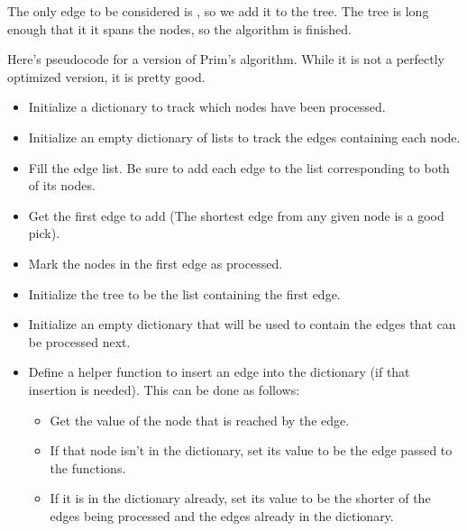 The only edge to be considered is , so we add it to the tree.
The tree is long enough that it it spans the nodes, so the algorithm is finished.

Here's pseudocode for a version of Prim's algorithm.
While it is not a perfectly optimized version, it is pretty good.

\begin{itemize}


\item Initialize a dictionary to track which nodes have been processed.

\item Initialize an empty dictionary of lists to track the edges containing each node.

\item Fill the edge list.
	Be sure to add each edge to the list corresponding to both of its nodes.

\item Get the first edge to add (The shortest edge from any given node is a good pick).

\item Mark the nodes in the first edge as processed.

\item Initialize the tree to be the list containing the first edge.

\item Initialize an empty dictionary that will be used to contain the edges that can be processed next.

\item Define a helper function to insert an edge into the dictionary (if that insertion is needed).
	This can be done as follows:

	\begin{itemize}

	\item Get the value of the node that is reached by the edge.

	\item If that node isn't in the dictionary, set its value to be the edge passed to the functions.

	\item If it is in the dictionary already, set its value to be the shorter of the edges being processed and the edges already in the dictionary.


\end{itemize}
\end{itemize}
